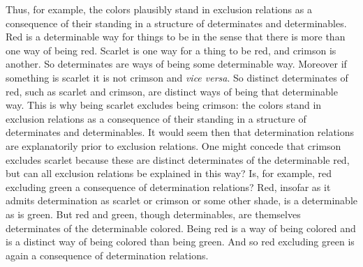 \documentclass[12pt]{article}
\begin{document}
Thus, for example, the colors plausibly stand in exclusion relations as a consequence of their standing in a structure of determinates and determinables. Red is a determinable way for things to be in the sense that there is more than one way of being red. Scarlet is one way for a thing to be red, and crimson is another. So determinates are ways of being some determinable way. Moreover if something is scarlet it is not crimson and \emph{vice versa}. So distinct determinates of red, such as scarlet and crimson, are distinct ways of being that determinable way. This is why being scarlet excludes being crimson: the colors stand in exclusion relations as a consequence of their standing in a structure of determinates and determinables. It would seem then that determination relations are explanatorily prior to exclusion relations. One might concede that crimson excludes scarlet because these are distinct determinates of the determinable red, but can all exclusion relations be explained in this way? Is, for example, red excluding green a consequence of determination relations? Red, insofar as it admits determination as scarlet or crimson or some other shade, is a determinable as is green. But red and green, though determinables, are themselves determinates of the determinable colored. Being red is a way of being colored and is a distinct way of being colored than being green. And so red excluding green is again a consequence of determination relations.
\end{document}
